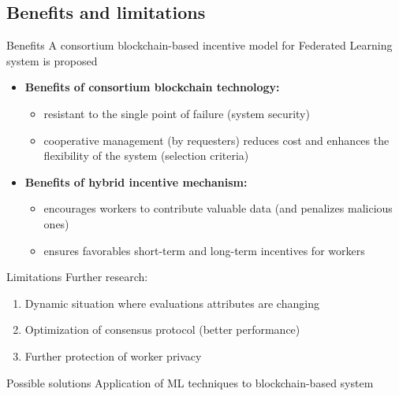 \subsection{Benefits and limitations}

\begin{frame}{Benefits}
	A consortium blockchain-based incentive model for Federated Learning system is
proposed
  \begin{itemize}
  \item \textbf{Benefits of consortium blockchain technology:} 
  	\begin{itemize}
  		\item resistant to the single point of failure (system security)
  		\item cooperative management (by requesters) reduces cost and enhances the flexibility of the system (selection criteria)
  	\end{itemize}
  \item \textbf{Benefits of hybrid incentive mechanism:}
  	\begin{itemize}
  		\item encourages workers to contribute valuable data (and penalizes malicious ones)
  		\item ensures favorables short-term and long-term incentives for workers
  	\end{itemize}
  \end{itemize}
\end{frame}

\begin{frame}{Limitations}
	Further research:
  \begin{enumerate}
  \item Dynamic situation where evaluations attributes are changing
  \item Optimization of consensus protocol (better performance)
  \item Further protection of worker privacy
  \end{enumerate}
  \begin{block}{Possible solutions}
  Application of ML techniques to blockchain-based system
  \end{block}
\end{frame}